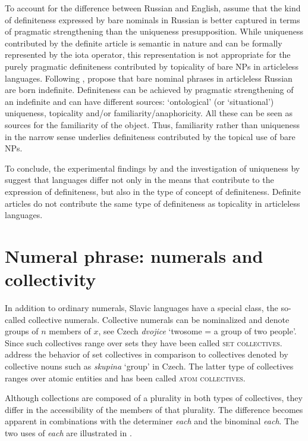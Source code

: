 \documentclass[output=paper,
colorlinks,
citecolor=brown,
newtxmath
]{langscibook}
\begin{document}
\noindent To account for the difference between Russian and English, \citeauthor{Seres.Borik2021} assume that the kind of definiteness expressed by bare nominals in Russian is better captured in terms of pragmatic strengthening than the uniqueness presupposition. While uniqueness contributed by the definite article is semantic in nature and can be formally represented by the iota operator, this representation is not appropriate for the purely pragmatic definiteness contributed by topicality of bare NPs in articleless languages. Following \citet{Heim2011}, \citeauthor{Seres.Borik2021} propose that bare nominal phrases in articleless Russian are born indefinite. Definiteness can be achieved by pragmatic strengthening of an indefinite and can have different sources: `ontological' (or `situational') uniqueness, topicality and/or familiarity/anaphoricity. All these can be seen as sources for the familiarity of the object. Thus, familiarity rather than uniqueness in the narrow sense underlies definiteness contributed by the topical use of bare NPs.

To conclude, the experimental findings by \cite{Simik.Demian2020} and the investigation of uniqueness by \citeauthor{Seres.Borik2021} suggest that languages differ not only in the means that contribute to the expression of definiteness, but also in the type of concept of definiteness. Definite articles do not contribute the same type of definiteness as topicality in articleless languages.
\section{Numeral phrase: numerals and collectivity}

In addition to ordinary numerals, Slavic languages have a special class, the so-called collective numerals. Collective numerals can be nominalized and denote groups of $n$ members of $x$, see Czech \textit{dvojice} `twosome = a group of two people'. Since such collectives range over sets they have been called \textsc{set collectives}.  address the behavior of set collectives in comparison to collectives denoted by collective nouns such as \textit{skupina} `group' in Czech. The latter type of collectives ranges over atomic entities and has been called \textsc{atom collectives}.

Although collections are composed of a plurality in both types of collectives, they differ in the accessibility of the members of that plurality. The difference becomes apparent in combinations with the determiner \textit{each} and the binominal \textit{each}. The two uses of \textit{each} are illustrated in .
\end{document}

